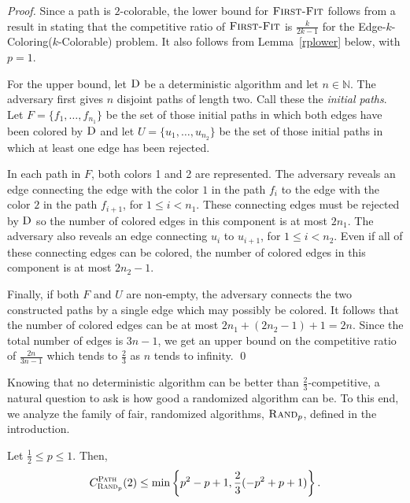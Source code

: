 \documentclass[smallextended]{svjour3}
\def\mckcol{{\sc Edge-$k$-Coloring($k$-Colorable)}\xspace}
\def\paths{\text{\sc Path}\xspace}
\newcommand{\FF}{\ensuremath{\operatorname{\textsc{First-Fit}}}\xspace}
\newcommand{\RP}{\ensuremath{\operatorname{\textsc{Rand}}}\xspace}
\newcommand{\algo}[1]{\ensuremath{\operatorname{\textsc{#1}}}\xspace}
\begin{document}
\begin{proof}
Since a path is $2$-colorable, the lower bound for \FF follows from a
 result in \cite{kedge} stating that the competitive ratio of \FF is
 $\frac{k}{2k-1}$ for the \mckcol problem.
It also follows from Lemma~\ref{rplower} below, with $p=1$.

For the upper bound, let $\algo{D}$ be a deterministic algorithm and let $n\in\mathbb{N}$. The adversary first gives $n$ disjoint paths of length two. Call these the \emph{initial paths}. Let $F=\{f_{1},\ldots , f_{n_{1}}\}$ be the set of those initial paths in which both edges have been colored by $\algo{D}$ and let $U=\{u_{1},\ldots , u_{n_{2}}\}$ be the set of those initial paths in which at least one edge has been rejected. 

In each path in $F$, both colors 1 and 2 are represented.
The adversary reveals an edge connecting the edge with the color $1$ in the path $f_i$ to the edge with the color $2$ in the path $f_{i+1}$, for $1\leq i< n_1$. These connecting edges must be rejected by $\algo{D}$ so the number of colored edges in this component is at most $2n_1$. The adversary also reveals an edge connecting $u_i$ to $u_{i+1}$, for $1\leq i < n_2$. Even if all of these connecting edges can be colored, the number of colored edges in this component is at most $2n_2-1$. 

Finally, if both $F$ and $U$ are non-empty, the adversary connects the two constructed paths by a single edge which may possibly be colored. It follows that the number of colored edges can be at most $2n_1+(2n_2-1)+1=2n$. Since the total number of edges is $3n-1$, we get an upper bound on the competitive ratio of $\frac{2n}{3n-1}$ which tends to $\frac23$ as $n$ tends to infinity.
\qed\end{proof}

Knowing that no deterministic algorithm can be better than
 $\frac23$-competitive, a natural question to ask is how good a
 randomized algorithm can be. 
To this end, we analyze the family of fair, randomized
 algorithms, $\RP_p$, defined in the introduction.

\begin{lemma}
\label{rpupper}
Let $\frac12 \leq p\leq 1$. Then,
\begin{displaymath}
  C_{\RP_p}^{\text{\paths}}(2) \leq \min\left\{p^2-p+1, \frac{2}{3}(-p^2+p+1)\right\}.
\end{displaymath}
\end{lemma}
\end{document}
